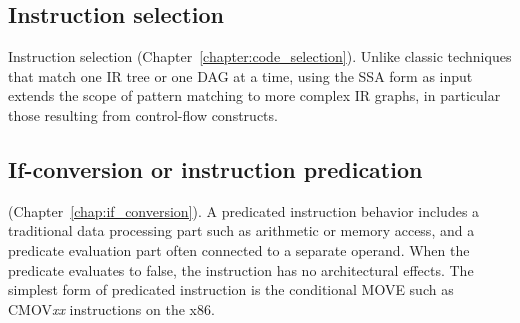\subsection{Instruction selection}

Instruction selection (Chapter~\ref{chapter:code_selection}). Unlike
classic techniques that match one IR tree or one DAG at a time, using the SSA
form as input extends the scope of pattern matching to more complex IR graphs,
in particular those resulting from control-flow constructs.

\subsection{If-conversion or instruction predication}

(Chapter~\ref{chap:if_conversion}). A predicated instruction behavior includes a
traditional data processing part such as arithmetic or memory access, and a
predicate evaluation part often connected to a separate operand. When the
predicate evaluates to false, the instruction has no architectural effects. The
simplest form of predicated instruction is the conditional MOVE such as
CMOV\emph{xx} instructions on the x86. 





